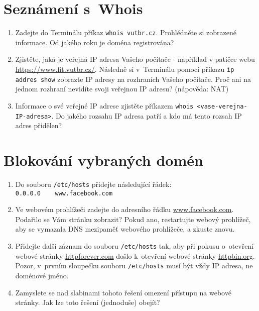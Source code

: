 \section{Seznámení s~Whois}
\begin{enumerate}
    \item Zadejte do Terminálu příkaz \texttt{whois vutbr.cz}. Prohlédněte si zobrazené informace. Od jakého roku je doména registrována?
    \item Zjistěte, jaká je veřejná IP adresa Vašeho počítače - například v patičce webu \url{https://www.fit.vutbr.cz/}. Následně si v~Terminálu pomocí příkazu \texttt{ip addres show} zobrazte IP adresy na rozhraních Vašeho počítače. Proč ani na jednom rozhraní nevidíte svoji veřejnou IP adresu? (nápověda: NAT)
    \item Informace o své veřejné IP adrese zjistěte příkazem \texttt{whois <vase-verejna-IP-adresa>}. Do jakého rozsahu IP adresa patří a kdo má tento rozsah IP adres přidělen?
\end{enumerate}

\section{Blokování vybraných domén}
\begin{enumerate}
	\item Do souboru \texttt{/etc/hosts} přidejte následující řádek:\\
    \verb|0.0.0.0    www.facebook.com|
    \item Ve webovém prohlížeči zadejte do adresního řádku \url{www.facebook.com}. Podařilo se Vám stránku zobrazit? Pokud ano, restartujte webový prohlížeč, aby se vymazala DNS mezipaměť webového prohlížeče, a zkuste znovu.
    \item Přidejte další záznam do souboru \texttt{/etc/hosts} tak, aby při pokusu o~otevření webové stránky \url{httpforever.com} došlo k~otevření webové stránky \url{httpbin.org}. Pozor, v~prvním sloupečku souboru \texttt{/etc/hosts} musí být vždy IP adresa, ne doménové jméno.
    \item Zamyslete se nad slabinami tohoto řešení omezení přístupu na webové stránky. Jak lze toto řešení (jednoduše) obejít?
\end{enumerate}

